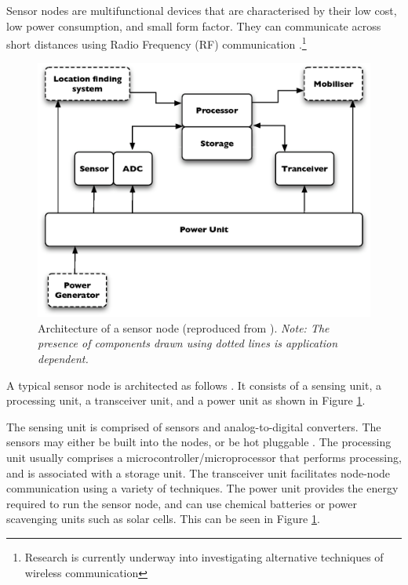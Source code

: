 Sensor nodes are multifunctional devices that are characterised by their low 
cost, low power consumption, and small form factor. They can communicate across 
short distances using Radio Frequency (RF) communication 
\cite{SensorSurveyAkyildiz:2002}.\footnote{Research is currently underway into
investigating alternative techniques of wireless communication}
\begin{figure}[h] \centering
\label{Fig:SensorNodeArch}
\includegraphics[scale=0.55]{img/SensorNodeArch.eps} \caption[Architecture of a 
sensor node] {Architecture of a sensor node (reproduced from
\cite{SensorSurveyAkyildiz:2002}). \emph{Note: The presence of components drawn using dotted lines is application dependent.}}
\end{figure} 

A typical sensor node is architected as follows 
\cite{SensorSurveyAkyildiz:2002}. It consists of a sensing unit, a processing 
unit, a transceiver unit, and a power unit as shown in Figure 
\ref{Fig:SensorNodeArch}.

The sensing unit is comprised of sensors and analog-to-digital converters. 
The sensors may either be built into the nodes, or be hot pluggable 
\cite{MANETWarrier:2007}. The processing unit usually comprises a 
microcontroller/microprocessor that performs processing, and is associated with 
a storage unit. The transceiver unit facilitates node-node communication using 
a variety of techniques. The power 
unit provides the energy required to run the sensor node, and can use chemical 
batteries or power scavenging units such as solar cells. This can be seen in 
Figure \ref{Fig:SensorNodeArch}.

